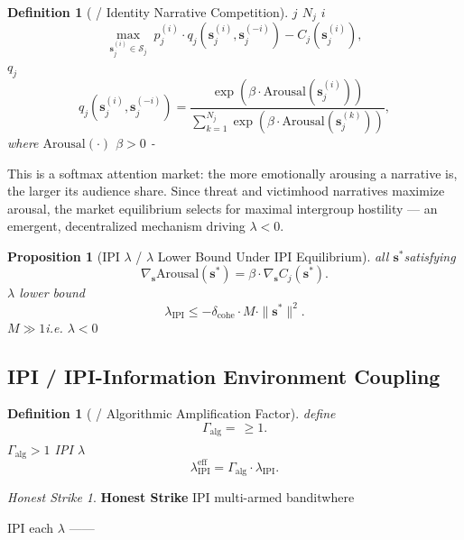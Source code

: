 \documentclass[11pt,a4paper]{article}
\newtheorem{proposition}[theorem]{Proposition}
\newtheorem{definition}[theorem]{Definition}
\theoremstyle{remark}
\newcommand{\paren}[1]{\left(#1\right)}
\newcommand{\lambdaparam}{\lambda}
\newtheorem{honestattack}{Honest Strike}
\newenvironment{attackbox}{%
  \begin{center}
  \color{red}
  \begin{minipage}{0.92\textwidth}
  \begin{honestattack}
}{%
  \end{honestattack}
  \end{minipage}
  \end{center}
}
\begin{document}
\begin{definition}[ / Identity Narrative Competition]
\label{def:narrative_comp}
 $j$  $N_j$  $i$ 
\[
\max_{\mathbf{s}_j^{(i)} \in \mathcal{S}_j} \;
p_j^{(i)} \cdot q_j(\mathbf{s}_j^{(i)}, \mathbf{s}_j^{(-i)}) - C_j(\mathbf{s}_j^{(i)}),
\]
 $q_j$ 
\[
q_j(\mathbf{s}_j^{(i)}, \mathbf{s}_j^{(-i)}) = 
\frac{\exp\paren{\beta \cdot \text{Arousal}(\mathbf{s}_j^{(i)})}}
{\sum_{k=1}^{N_j} \exp\paren{\beta \cdot \text{Arousal}(\mathbf{s}_j^{(k)})}},
\]
where $\text{Arousal}(\cdot)$ $\beta > 0$ -
\end{definition}

This is a softmax attention market: the more emotionally arousing a narrative is,
the larger its audience share. Since threat and victimhood narratives maximize
arousal, the market equilibrium selects for maximal intergroup hostility — an
emergent, decentralized mechanism driving $\lambdaparam < 0$.

\begin{proposition}[IPI  $\lambdaparam$  / $\lambdaparam$ Lower Bound Under IPI Equilibrium]
\label{prop:IPI_equilibrium}
all $\mathbf{s}^*$satisfying
\[
\nabla_{\mathbf{s}} \text{Arousal}(\mathbf{s}^*) = \beta \cdot \nabla_{\mathbf{s}} C_j(\mathbf{s}^*).
\]
 $\lambdaparam$ lower bound
\[
\lambdaparam_{\text{IPI}} \leq -\delta_{\text{cohe}} \cdot M \cdot \|\mathbf{s}^*\|^2.
\]
$M \gg 1$i.e.
 $\lambdaparam < 0$
\end{proposition}

\subsection{IPI  / IPI-Information Environment Coupling}

\begin{definition}[ / Algorithmic Amplification Factor]
\label{def:alg_amp}
define
\[
\Gamma_{\text{alg}} = \frac{\text{}}{\text{}} \geq 1.
\]
 $\Gamma_{\text{alg}} > 1$ IPI  $\lambdaparam$ 
\[
\lambdaparam_{\text{IPI}}^{\text{eff}} = \Gamma_{\text{alg}} \cdot \lambdaparam_{\text{IPI}}.
\]
\end{definition}

\begin{attackbox}
\textbf{Honest Strike} IPI \textbf{}
multi-armed banditwhere

IPI each
 $\lambdaparam$ ——\textit{}

\end{attackbox}

\end{document}
